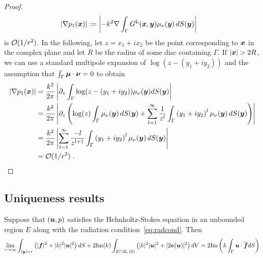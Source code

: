 \begin{proof}
\begin{align}
|\nabla p_1({\boldsymbol x})| &:= \left |-k^2 \nabla \int_\Gamma G^{\textrm{L}}({\boldsymbol x},{\boldsymbol y})
\mu_\nu({\boldsymbol y}) \, dS({\boldsymbol y}) \right |
\end{align}
is $\mathcal{O} (1/r^2)$. In the following, let $z = x_1 + i x_2$ be the
point corresponding to ${\boldsymbol x}$ in the complex plane and let $R$
be the radius of some disc containing $\Gamma$. If $|{\boldsymbol x}| > 2R$,
we can use a standard multipole expansion of $\log(z-(y_1+iy_2))$
and the assumption that $\int_\Gamma {\boldsymbol \mu} \cdot {\boldsymbol \nu} = 0$
to obtain
\begin{align}
|\nabla p_1({\boldsymbol x})| &= \frac{k^2}{2\pi} \left |  \partial_z \int_\Gamma \log(z-(y_1+iy_2))
\mu_\nu({\boldsymbol y}) dS({\boldsymbol y}) \right | \\
&= \frac{k^2}{2\pi} \left |  \partial_z  \left ( \log(z) \int_\Gamma \mu_\nu({\boldsymbol y}) \, dS({\boldsymbol y})
+ \sum_{l=1}^\infty \frac{1}{z^l} \int_\Gamma \left( y_1+iy_2 \right)^l \mu_\nu({\boldsymbol y}) \, dS({\boldsymbol y})
\right ) \right | \\
&= \frac{k^2}{2\pi} \left | \sum_{l=1}^\infty \frac{-l}{z^{l+1}}
\int_\Gamma \left( y_1+iy_2 \right)^l \mu_\nu({\boldsymbol y}) \, dS({\boldsymbol y}) \right | \\
&= \mathcal{O} (1/r^2) \; .
\end{align}
\end{proof}

\subsection{Uniqueness results}


\begin{lem}
\label{lem:rep}
Suppose that $({\boldsymbol u},p)$ satisfies the Helmholtz-Stokes equation in 
an unbounded region $E$ along with the radiation 
condition~\cref{eq:radcond}. 
Then 
\begin{equation}
\label{eq:repinfest}
\lim_{r\to\infty}
\int_{|{\boldsymbol y}|=r} \left( |{\boldsymbol f}|^2 + |k|^2 |{\boldsymbol u}|^2 \right) dS +
2 {\textrm{\textup{Im}}}(k) \int_{E \cap B_{r}(0)} \left(|k|^2 |{\boldsymbol u}|^2 + |2{\boldsymbol e}({\boldsymbol u})|^2 \right)
dV = 2 {\textrm{\textup{Im}}} \left( k \int_{\Gamma} {\boldsymbol u} \cdot \overline{{\boldsymbol f}} dS  \right)
\end{equation}
\end{lem}

